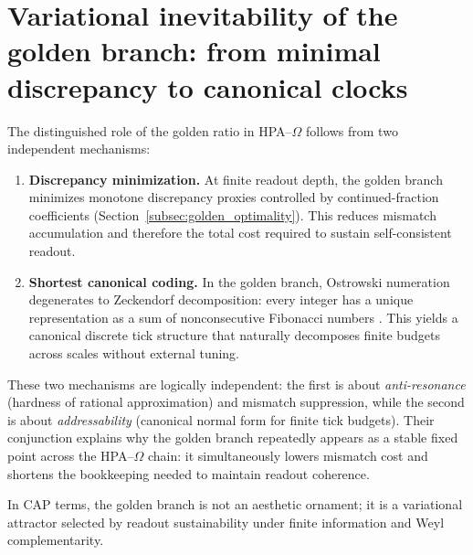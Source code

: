 \section{Variational inevitability of the golden branch: from minimal discrepancy to canonical clocks}
\label{sec:golden_ratio}

The distinguished role of the golden ratio in HPA--$\Omega$ follows from two independent mechanisms:
\begin{enumerate}
  \item \textbf{Discrepancy minimization.} At finite readout depth, the golden branch minimizes monotone discrepancy proxies controlled by continued-fraction coefficients (Section~\ref{subsec:golden_optimality}). This reduces mismatch accumulation and therefore the total cost required to sustain self-consistent readout.
  \item \textbf{Shortest canonical coding.} In the golden branch, Ostrowski numeration degenerates to Zeckendorf decomposition: every integer has a unique representation as a sum of nonconsecutive Fibonacci numbers \cite{Zeckendorf1972}. This yields a canonical discrete tick structure that naturally decomposes finite budgets across scales without external tuning.
\end{enumerate}

\noindent These two mechanisms are logically independent: the first is about \emph{anti-resonance} (hardness of rational approximation) and mismatch suppression, while the second is about \emph{addressability} (canonical normal form for finite tick budgets). Their conjunction explains why the golden branch repeatedly appears as a stable fixed point across the HPA--$\Omega$ chain: it simultaneously lowers mismatch cost and shortens the bookkeeping needed to maintain readout coherence.

In CAP terms, the golden branch is not an aesthetic ornament; it is a variational attractor selected by readout sustainability under finite information and Weyl complementarity.


